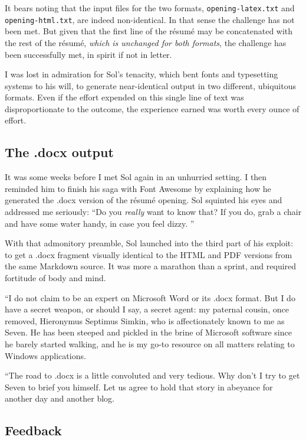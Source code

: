 \documentclass[
  british,
  a4paper,
  rgb,
  dvipsnames,
  svgnames,
  hyphens]{article}
\begin{document}
It bears noting that the input files for the two formats,
\texttt{opening-latex.txt} and \texttt{opening-html.txt}, are indeed
non-identical. In that sense the challenge has not been met. But given
that the first line of the résumé may be concatenated with the rest of
the résumé, \emph{which is unchanged for both formats}, the challenge
has been successfully met, in spirit if not in letter.

I was lost in admiration for Sol's tenacity, which bent fonts and
typesetting systems to his will, to generate near-identical output in
two different, ubiquitous formats. Even if the effort expended on this
single line of text was disproportionate to the outcome, the experience
earned was worth every ounce of effort.

\hypertarget{the-.docx-output}{%
\subsection{The .docx output}\label{the-.docx-output}}

It was some weeks before I met Sol again in an unhurried setting. I then
reminded him to finish his saga with Font Awesome by explaining how he
generated the .docx version of the résumé opening. Sol squinted his eyes
and addressed me seriously: ``Do you \emph{really} want to know that? If
you do, grab a chair and have some water handy, in case you feel dizzy.
 \normalfont''

With that admonitory preamble, Sol launched into the third part of his
exploit: to get a .docx fragment visually identical to the HTML and PDF
versions from the same Markdown source. It was more a marathon than a
sprint, and required fortitude of body and mind.

``I do not claim to be an expert on Microsoft Word or its .docx format.
But I do have a secret weapon, or should I say, a secret agent: my
paternal cousin, once removed, Hieronymus Septimus Simkin, who is
affectionately known to me as Seven. He has been steeped and pickled in
the brine of Microsoft software since he barely started walking, and he
is my go-to resource on all matters relating to Windows applications.

``The road to .docx is a little convoluted and very tedious. Why don't I
try to get Seven to brief you himself. Let us agree to hold that story
in abeyance for another day and another blog.

\hypertarget{feedback}{%
\subsection{Feedback}\label{feedback}}
\end{document}
